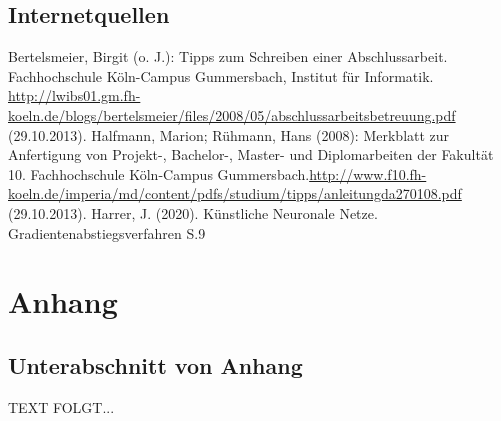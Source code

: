 \documentclass[a4paper,12pt,oneside]{article}
\begin{document}
    \subsection{Internetquellen}
    \begin{thebibliography}{HR08} %
      Bertelsmeier, Birgit (o. J.): Tipps zum Schrei\-b\-en ei\-n\-er Ab\-sch\-luss\-ar\-beit. Fach\-hoch\-schu\-le Köln-Campus Gummersbach, Institut für Informatik. \url{http://lwibs01.gm.fh-koeln.de/blogs/bertelsmeier/files/2008/05/abschlussarbeitsbetreuung.pdf} (29.10.2013).
       Halfmann, Marion; Rühmann, Hans (2008): Merkblatt zur Anfertigung von Projekt-, Bachelor-, Master- und Diplomarbeiten der Fakultät 10. Fachhochschule Köln-Campus Gummersbach.\url{http://www.f10.fh-koeln.de/imperia/md/content/pdfs/studium/tipps/anleitungda270108.pdf} (29.10.2013).
       Harrer, J. (2020). Künstliche Neuronale Netze. Gradientenabstiegsverfahren S.9
    \end{thebibliography} 
  

  \newpage
  \setcounter{section}{0} %
  \renewcommand*\thesection{\Alph{section}} %
  \section{Anhang}\label{anhang}
    \subsection{Unterabschnitt von Anhang}\label{subsec_UabsAnhang}
    TEXT FOLGT...
  

  \newpage
  \pagestyle{empty}
\end{document}
